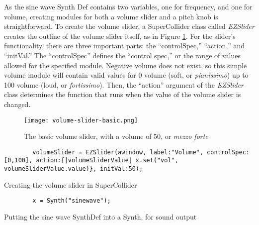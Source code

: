 As the sine wave Synth Def contains two variables, one for frequency, and one for volume, creating modules for both a volume slider and a pitch knob is straightforward. To create the volume slider, a SuperCollider class called \textit{EZSlider} creates the outline of the volume slider itself, as in Figure \ref{fig:volume-slider-basic}. For the slider's functionality, there are three important parts: the ``controlSpec,'' ``action,'' and ``initVal.'' The ``controlSpec'' defines the ``control spec,'' or the range of values allowed for the specified module. Negative volume does not exist, so this simple volume module will contain valid values for 0 volume (soft, or \textit{pianissimo}) up to 100 volume (loud, or \textit{fortissimo}). Then, the ``action'' argument of the \textit{EZSlider} class determines the function that runs when the value of the volume slider is changed. 

\begin{figure}[h]
  \centering
  \texttt{[image: volume-slider-basic.png]}
  \caption{The basic volume slider, with a volume of 50, or \textit{mezzo forte}}
  \label{fig:volume-slider-basic}
\end{figure}

\begin{listing}
	\begin{lstlisting}
		volumeSlider = EZSlider(awindow, label:"Volume", controlSpec:[0,100], action:{|volumeSliderValue| x.set("vol", volumeSliderValue.value)}, initVal:50);
	\end{lstlisting}
	\caption{Creating the volume slider in SuperCollider}
	\label{lst:volume-slider-waveform}
\end{listing}

\begin{listing}
	\begin{lstlisting}
		x = Synth("sinewave");
	\end{lstlisting}
	\caption{Putting the sine wave SynthDef into a Synth, for sound output}
	\label{lst:sinewave-synth}
\end{listing}

